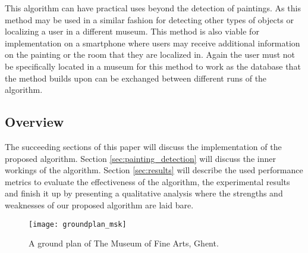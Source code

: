 This algorithm can have practical uses beyond the detection of paintings. As this method may be used in a similar fashion for detecting other types of objects or localizing a user in a different museum. This method is also viable for implementation on a smartphone where users may receive additional information on the painting or the room that they are localized in. Again the user must not be specifically located in a museum for this method to work as the database that the method builds upon can be exchanged between different runs of the algorithm.

\subsection{Overview}
The succeeding sections of this paper will discuss the implementation of the proposed algorithm. Section \ref{sec:painting_detection} will discuss the inner workings of the algorithm. Section \ref{sec:results} will describe the used performance metrics to evaluate the effectiveness of the algorithm, the experimental results and finish it up by presenting a qualitative analysis where the strengths and weaknesses of our proposed algorithm are laid bare.



\begin{figure}
	\texttt{[image: groundplan\_msk]}
	\caption{A ground plan of The Museum of Fine Arts, Ghent. }
	\label{fig:groundplan_msk}
\end{figure}